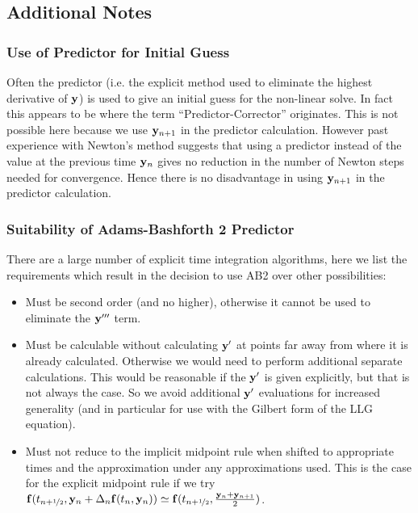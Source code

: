 \subsection{Additional Notes}


\subsubsection{Use of Predictor for Initial Guess}

Often the predictor (i.e. the explicit method used to eliminate the highest derivative of $\mathbf{y}$) is used to give an initial guess for the non-linear solve.
In fact this appears to be where the term ``Predictor-Corrector'' originates.
This is not possible here because we use $\mathbf{y}_{n+1}$ in the predictor calculation.
However past experience with Newton's method suggests that using a predictor instead of the value at the previous time $\mathbf{y}_n$ gives no reduction in the number of Newton steps needed for convergence.\cite{Milan, Matthias}
Hence there is no disadvantage in using $\mathbf{y}_{n+1}$ in the predictor calculation.

\subsubsection{Suitability of Adams-Bashforth 2 Predictor}

There are a large number of explicit time integration algorithms, here we list the requirements which result in the decision to use AB2 over other possibilities:
\begin{itemize}
\item Must be second order (and no higher), otherwise it cannot be used to eliminate the $\mathbf{y}'''$ term.

\item Must be calculable without calculating $\mathbf{y}'$ at points far away from where it is already calculated.
  Otherwise we would need to perform additional separate calculations.
  This would be reasonable if the $\mathbf{y}'$ is given explicitly, but that is not always the case.
  So we avoid additional $\mathbf{y}'$ evaluations for increased generality (and in particular for use with the Gilbert form of the LLG equation).

\item Must not reduce to the implicit midpoint rule when shifted to appropriate times and the approximation under any approximations used.
  This is the case for the explicit midpoint rule if we try ${\mathbf{f}}(t_{n+\nicefrac{1}{2}}, \mathbf{y}_n + \Delta_{n} {\mathbf{f}}(t_n, \mathbf{y}_n)) \simeq {\mathbf{f}}(t_{n+\nicefrac{1}{2}}, \frac{\mathbf{y}_n + \mathbf{y}_{n+1}}{2})$.
\end{itemize}

